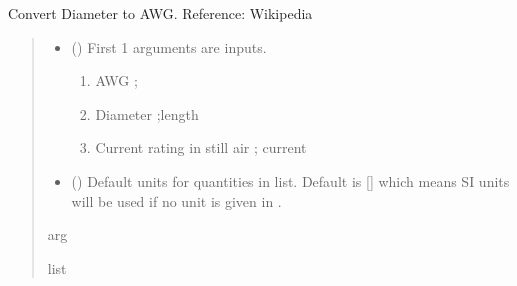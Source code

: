 \documentclass[letterpaper,10pt,english]{sphinxmanual}
\begin{document}

\begin{fulllineitems}
\label{\detokenize{components:components.Dia2AWG}}
\pysigstartsignatures
{}
\pysigstopsignatures
\sphinxAtStartPar
Convert Diameter to AWG.
Reference:  Wikipedia
\begin{quote}\begin{description}
\begin{itemize}
\item {}
\sphinxAtStartPar
{} () \textendash{}
\sphinxAtStartPar
First 1 arguments are inputs.
\begin{enumerate}
%
\item {}
\sphinxAtStartPar
AWG ;

\item {}
\sphinxAtStartPar
Diameter ;length

\item {}
\sphinxAtStartPar
Current rating in still air ; current

\end{enumerate}


\item {}
\sphinxAtStartPar
{} (\sphinxstyleliteralemphasis{\sphinxupquote{, }}) \textendash{} Default units for quantities in  list. Default is {[}{]} which means SI units will be used if no unit is given in .

\end{itemize}

\sphinxAtStartPar
arg

\sphinxAtStartPar
list

\end{description}\end{quote}

\end{fulllineitems}
\end{document}
